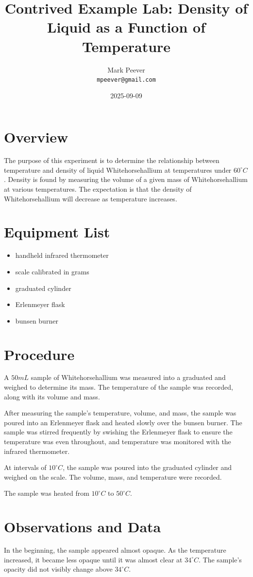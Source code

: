 \documentclass[11pt, oneside]{article}   	%
\title{Contrived Example Lab: Density of Liquid \chemname as a Function of Temperature}
\author{Mark Peever\\ \texttt{mpeever@gmail.com}}
\date{2025-09-09}							%
\newcommand{\chemname}{Whitehorsehallium }
\begin{document}
\maketitle

\section{Overview}
The purpose of this experiment is to determine the relationship between temperature and density of liquid \chemname at temperatures under $60^{\circ}C$. 
Density is found by measuring the volume of a given mass of \chemname at various temperatures.
The expectation is that the density of \chemname will decrease as temperature increases.

\section{Equipment List}
\begin{itemize}
\item handheld infrared thermometer
\item scale calibrated in grams
\item graduated cylinder
\item Erlenmeyer flask
\item bunsen burner
\end{itemize}

\section{Procedure}
A $50 mL$ sample of \chemname  was measured into a graduated and weighed to determine its mass.
The temperature of the sample was recorded, along with its volume and mass.

After measuring the sample's temperature, volume, and mass, the sample was poured into an Erlenmeyer flask and heated slowly over the bunsen burner.
The sample was stirred frequently by swishing the Erlenmeyer flask to ensure the temperature was even throughout, and temperature was monitored with the infrared thermometer.

At intervals of $10^{\circ}C$, the sample was poured into the graduated cylinder and weighed on the scale. The volume, mass, and temperature were recorded.

The sample was heated from $10^{\circ}C$ to $50^{\circ}C$.

\section{Observations and Data}
In the beginning, the sample appeared almost opaque. As the temperature increased, it became less opaque until it was almost clear at $34^{\circ}C$.
The sample's opacity did not visibly change above $34^{\circ}C$.
\end{document}
